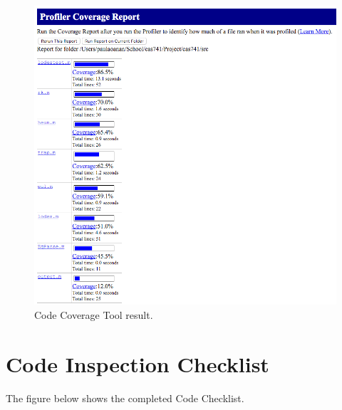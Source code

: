 \documentclass[12pt, titlepage]{article}
\begin{document}
\begin{figure}[H]
 \includegraphics[width=\linewidth]{images/CCM}
  \caption{Code Coverage Tool result.}
  \label{fig:CCM}
\end{figure}

\newpage

\section{Code Inspection Checklist} \label{sec_cic}
The figure below shows the completed Code Checklist.
\end{document}
